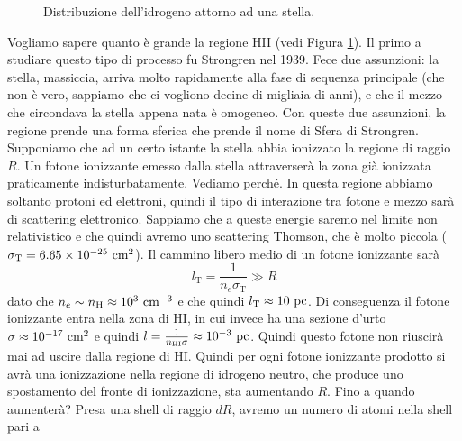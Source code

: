 \begin{figure}[h!]
    \centering
    \caption{Distribuzione dell'idrogeno attorno ad una stella.}
    \label{fig:idrogenostelle}
\end{figure}
Vogliamo sapere quanto è grande la regione HII (vedi Figura \ref{fig:idrogenostelle}). Il primo a studiare questo tipo di processo fu Strongren nel 1939. Fece due assunzioni: la stella, massiccia, arriva molto rapidamente alla fase di sequenza principale (che non è vero, sappiamo che ci vogliono decine di migliaia di anni), e che il mezzo che circondava la stella appena nata è omogeneo. Con queste due assunzioni, la regione prende una forma sferica che prende il nome di Sfera di Strongren. Supponiamo che ad un certo istante la stella abbia ionizzato la regione di raggio $R$. Un fotone ionizzante emesso dalla stella attraverserà la zona già ionizzata praticamente indisturbatamente. Vediamo perché. In questa regione abbiamo soltanto protoni ed elettroni, quindi il tipo di interazione tra fotone e mezzo sarà di scattering elettronico. Sappiamo che a queste energie saremo nel limite non relativistico e che quindi avremo uno scattering Thomson, che è molto piccola ($\sigma_\text{T}=6.65\times10^{-25}\text{ cm}^2$). Il cammino libero medio di un fotone ionizzante sarà
\begin{equation}
    l_\text{T} = \frac{1}{n_e\sigma_\text{T}} \gg R
\end{equation}
dato che $n_e\sim n_\text{H}\approx10^3\text{ cm}^{-3}$ e che quindi $l_\text{T}\approx10 \text{ pc}$. Di conseguenza il fotone ionizzante entra nella zona di HI, in cui invece ha una sezione d'urto $\sigma \approx 10^{-17}\text{ cm}^2$ e quindi $l=\frac{1}{n_\text{HI}\sigma}\approx 10^{-3}\text{ pc}$. Quindi questo fotone non riuscirà mai ad uscire dalla regione di HI. Quindi per ogni fotone ionizzante prodotto si avrà una ionizzazione nella regione di idrogeno neutro, che produce uno spostamento del fronte di ionizzazione, sta aumentando $R$. Fino a quando aumenterà? Presa una shell di raggio $dR$, avremo un numero di atomi nella shell pari a 
